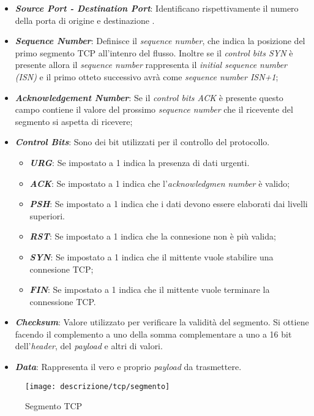 \begin{itemize}
\item \textit{\textbf{Source Port - Destination Port}}: Identificano rispettivamente il numero della porta di origine e destinazione .
\item \textit{\textbf{Sequence Number}}: Definisce il \emph{sequence number}, che indica la posizione del primo segmento TCP all'intenro del flusso. Inoltre se il \emph{control bits SYN \glsfirstoccur} è presente allora il \emph{sequence number} rappresenta il \emph{initial sequence number (ISN)} e il primo otteto successivo avrà come \emph{sequence number ISN+1};
\item \textit{\textbf{Acknowledgement Number}}: Se il \emph{control bits ACK \glsfirstoccur} è presente questo campo contiene il valore del prossimo \emph{sequence number} che il ricevente del segmento si aspetta di ricevere;
\item \textit{\textbf{Control Bits}}: Sono dei bit utilizzati per il controllo del protocollo. 
\begin{itemize}
    \item \textit{\textbf{URG}}: Se impostato a 1 indica la presenza di dati urgenti.
    \item \textit{\textbf{ACK}}: Se impostato a 1 indica che l'\emph{acknowledgmen  number} è valido;
    \item \textit{\textbf{PSH}}: Se impostato a 1 indica che i dati devono essere elaborati dai livelli superiori.
    \item \textit{\textbf{RST}}: Se impostato a 1 indica che la connesione non è più valida;
    \item \textit{\textbf{SYN}}: Se impostato a 1 indica che il mittente vuole stabilire una connesione TCP;
    \item \textit{\textbf{FIN}}: Se impostato a 1 indica che il mittente vuole terminare la connessione TCP.
\end{itemize}

\item \textit{\textbf{Checksum}}: Valore utilizzato per verificare la validità del segmento. Si ottiene facendo il complemento a uno della somma complementare a uno a 16 bit dell'\emph{header}, del \emph{payload} e altri di valori.
\item \textit{\textbf{Data}}: Rappresenta il vero e proprio \emph{payload} da trasmettere.
\end{itemize}

\begin{figure}[!h]
\centering
\texttt{[image: descrizione/tcp/segmento]}
\caption{Segmento TCP}
\label{fig}
\end{figure}

